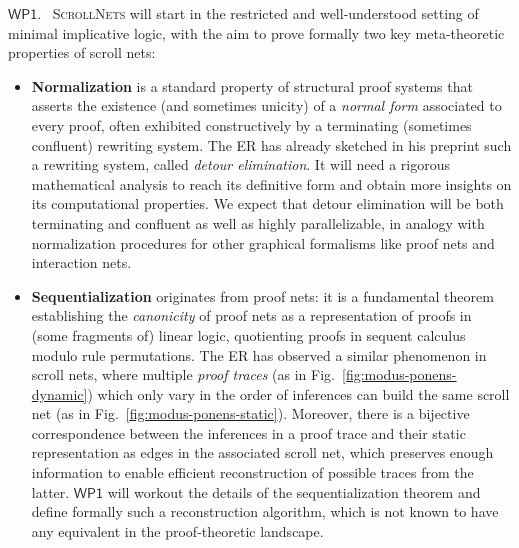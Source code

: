 \documentclass[11pt]{msca-pf}
\newcommand{\proj}{\small\textsc{ScrollNets}}
\newcommand{\WP}[1]{$\mathsf{WP#1}$}
\begin{document}
    \WP{1}.~ {\proj} will start in the restricted and well-understood setting of minimal
    implicative logic, with the aim to prove formally two key meta-theoretic properties of scroll
    nets:
    \begin{itemize}
        \item \textbf{Normalization} is a standard property of structural proof
        systems that asserts the existence (and sometimes unicity) of a \emph{normal form} associated to
        every proof, often exhibited constructively by a terminating (sometimes confluent) rewriting
        system. The ER has already sketched in his preprint such a rewriting system, called \emph{detour
        elimination}. It will need a rigorous mathematical analysis to reach its definitive form and
        obtain more insights on its computational properties. We expect that detour elimination will be
        both terminating and confluent as well as highly parallelizable, in analogy with normalization
        procedures for other graphical formalisms like proof nets and interaction nets.

        \item \textbf{Sequentialization} originates from proof nets: it is a fundamental theorem establishing the
        \emph{canonicity} of proof nets as a representation of proofs in (some fragments of) linear
        logic, quotienting proofs in sequent calculus modulo rule permutations. The ER has observed a
        similar phenomenon in scroll nets, where multiple \emph{proof traces} (as in
        Fig.~\ref{fig:modus-ponens-dynamic}) which only vary in the order of inferences can build the
        same scroll net (as in Fig.~\ref{fig:modus-ponens-static}). Moreover, there is a bijective
        correspondence between the inferences in a proof trace and their static representation as edges
        in the associated scroll net, which preserves enough information to enable efficient
        reconstruction of possible traces from the latter. \WP{1} will workout the details of the
        sequentialization theorem and define formally such a reconstruction algorithm, which is not
        known to have any equivalent in the proof-theoretic landscape.
    \end{itemize}
    
\end{document}
